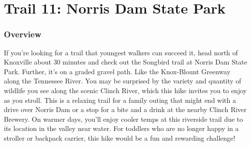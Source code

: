 \documentclass[
  letterpaper,
  DIV=11,
  numbers=noendperiod]{scrreprt}
\begin{document}
\chapter{Trail 11: Norris Dam State
Park}\label{trail-11-norris-dam-state-park}

\subsection{Overview}\label{overview-11}

If you're looking for a trail that youngest walkers can succeed it, head
north of Knoxville about 30 minutes and check out the Songbird trail at
Norris Dam State Park. Further, it's on a graded gravel path. Like the
Knox-Blount Greenway along the Tennessee River. You may be surprised by
the variety and quantity of wildlife you see along the scenic Clinch
River, which this hike invites you to enjoy as you stroll. This is a
relaxing trail for a family outing that might end with a drive over
Norris Dam or a stop for a bite and a drink at the nearby Clinch River
Brewery. On warmer days, you'll enjoy cooler temps at this riverside
trail due to its location in the valley near water. For toddlers who are
no longer happy in a stroller or backpack carrier, this hike would be a
fun and rewarding challenge!
\end{document}
